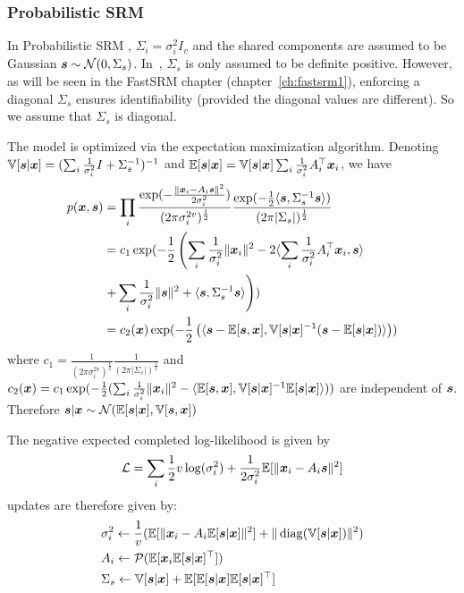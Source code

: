 \subsubsection{Probabilistic SRM}
\label{sec:probabilisticsrm}
In Probabilistic SRM , $\Sigma_i=\sigma_i^2 I_v$ and the shared
components are assumed to be Gaussian $\boldsymbol{s} \sim \mathcal{N}(0, \Sigma_s)$.
In~\cite{chen2015reduced}, $\Sigma_s$ is only assumed to be definite positive. However,
as will be seen in the FastSRM chapter (chapter~\ref{ch:fastsrm1}), enforcing a diagonal $\Sigma_s$ ensures
identifiability (provided the diagonal values are different). So we assume that $\Sigma_s$ is diagonal.

The model is optimized via the expectation maximization algorithm.
Denoting $\mathbb{V}[\boldsymbol{s} | \boldsymbol{x}] = (\sum_i \frac1{\sigma_i^2} I +
\Sigma_s^{-1})^{-1}$ and $\mathbb{E}[\boldsymbol{s} | \boldsymbol{x}] = \mathbb{V}[\boldsymbol{s} | \boldsymbol{x}] \sum_i \frac1{\sigma_i^2}
A_i^{\top}\boldsymbol{x}_i$, we have
\begin{align}
  p(\boldsymbol{x}, \boldsymbol{s}) &= \prod_i \frac{\exp(-\frac{\|\boldsymbol{x}_i - A_i \boldsymbol{s} \|^2}{2 \sigma_i^2})}{(2 \pi \sigma_i^{2v})^{\frac12}} \frac{\exp(-\frac12 \langle{ \boldsymbol{s}},{ \Sigma_s^{-1} \boldsymbol{s} }\rangle )}{(2 \pi | \Sigma_s|)^{\frac12}} \\
               &= c_1 \exp(-\frac12 \left( \sum_i \frac1{\sigma_i^2}\|\boldsymbol{x}_i\|^2 - 2  \langle{ \sum_i \frac1{\sigma_i^2} A_i^{\top}\boldsymbol{x}_i},{ \boldsymbol{s} }\rangle \right. \\& \left.+ \sum_i \frac1{\sigma_i^2} \| \boldsymbol{s} \|^2 + \langle{ \boldsymbol{s}},{ \Sigma_s^{-1} \boldsymbol{s} }\rangle  \right)) \\
               &= c_2(\boldsymbol{x}) \exp(-\frac12 \left( \langle{  \boldsymbol{s}- \mathbb{E}[\boldsymbol{s}},{ \boldsymbol{x}], \mathbb{V}[\boldsymbol{s} | \boldsymbol{x}]^{-1} ( \boldsymbol{s} - \mathbb{E}[\boldsymbol{s} | \boldsymbol{x}])  }\rangle \right)) \label{probsrmcompleted}
\end{align}
where $c_1 = \frac1{(2 \pi \sigma_i^{2v})^{\frac12}}\frac1{(2 \pi |
  \Sigma_s|)^{\frac12}}$ and $c_2(\boldsymbol{x}) = c_1 \exp(-\frac12( \sum_i
\frac1{\sigma_i^2}\|\boldsymbol{x}_i\|^2 - \langle{  \mathbb{E}[\boldsymbol{s}},{ \boldsymbol{x}], \mathbb{V}[\boldsymbol{s} | \boldsymbol{x}]^{-1} \mathbb{E}[\boldsymbol{s} | \boldsymbol{x}] }\rangle))$ are independent of $\boldsymbol{s}$.
Therefore $\boldsymbol{s}| \boldsymbol{x} \sim \mathcal{N}(\mathbb{E}[\boldsymbol{s} | \boldsymbol{x}], \mathbb{V}[\boldsymbol{s}, \boldsymbol{x}])$

The negative expected completed log-likelihood is given by
\begin{align}
	\mathcal{L} = \sum_i \frac12 v \log(\sigma_i^2) + \frac1{2 \sigma_i^2} \mathbb{E}[\| \boldsymbol{x}_i - A_i \boldsymbol{s} \|^2]
\end{align}
updates are therefore given by:
\begin{align}
&\sigma_i^2 \leftarrow \frac1{v} (\mathbb{E}[\| \boldsymbol{x}_i - A_i \mathbb{E}[\boldsymbol{s}|\boldsymbol{x}]\|^2] + \| \operatorname*{diag}(\mathbb{V}[\boldsymbol{s} | \boldsymbol{x}]) \|^2) \\
  &A_i \leftarrow \mathcal{P}(\mathbb{E}[\boldsymbol{x}_i \mathbb{E}[\boldsymbol{s}|\boldsymbol{x}]^{\top}]) \label{eq:psrm:Aiupdate} \\
  & \Sigma_s \leftarrow \mathbb{V}[\boldsymbol{s} | \boldsymbol{x}] + \mathbb{E}[\mathbb{E}[\boldsymbol{s} | \boldsymbol{x}] \mathbb{E}[\boldsymbol{s} | \boldsymbol{x}]^{\top}]
\end{align}

